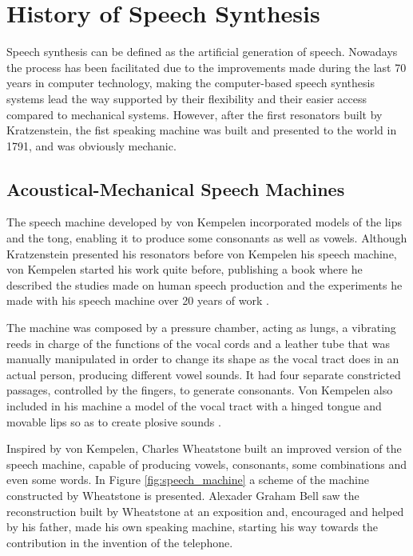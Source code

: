 \section{History of Speech Synthesis}
\label{history_speech_synthesis}
Speech synthesis can be defined as the artificial generation of speech. Nowadays the process has been facilitated due to the improvements made during the last 70 years in computer technology, making the computer-based speech synthesis systems lead the way supported by their flexibility and their easier access compared to mechanical systems. However, after the first resonators built by Kratzenstein, the fist speaking machine was built and presented to the world in 1791, and was obviously mechanic.

\subsection{Acoustical-Mechanical Speech Machines}
The speech machine developed by von Kempelen incorporated models of the lips and the tong, enabling it to produce some consonants as well as vowels. Although Kratzenstein presented his resonators before von Kempelen his speech machine, von Kempelen started his work quite before, publishing a book where he described the studies made on human speech production and the experiments he made with his speech machine over 20 years of work \cite{vonKempelen}.  

The machine was composed by a pressure chamber, acting as lungs, a vibrating reeds in charge of the functions of the vocal cords and a leather tube that was manually manipulated in order to change its shape as the vocal tract does in an actual person, producing different vowel sounds. It had four separate constricted passages, controlled by the fingers, to generate consonants. Von Kempelen also included in his machine a model of the vocal tract with a hinged tongue and movable lips so as to create plosive sounds \cite{Schroeder93, LemmettyMSc, flanagan_1973_speech}. 

Inspired by von Kempelen, Charles Wheatstone built an improved version of the speech machine, capable of producing vowels, consonants, some combinations and even some words. In Figure \ref{fig:speech_machine} a scheme of the machine constructed by Wheatstone is presented. Alexader Graham Bell saw the reconstruction built by Wheatstone at an exposition and, encouraged and helped by his father, made his own speaking machine, starting his way towards the contribution in the invention of the telephone.



